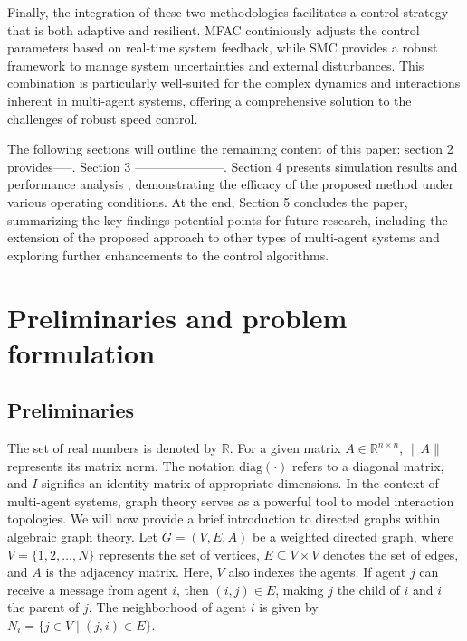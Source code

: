 \documentclass[journal,onecolumn]{IEEEtran}
\begin{document}
    Finally, the integration of these two methodologies facilitates a control strategy that is both adaptive and resilient. MFAC continiously adjusts the control parameters based on real-time system feedback, while SMC provides a robust framework to manage system uncertainties and external disturbances. This combination is particularly well-suited for the complex dynamics and interactions inherent in multi-agent systems, offering a comprehensive solution to the challenges of robust speed control.

    The following sections will outline the remaining content of this paper:
    section 2 provides-----. Section 3 ---------------------. Section 4 presents simulation results and performance analysis , demonstrating the efficacy of the proposed method under various operating conditions.
    At the end, Section 5 concludes the paper, summarizing the key findings potential points for future research, including the extension of the proposed approach to other types of multi-agent systems and exploring further enhancements to the control algorithms.



\section{Preliminaries and problem formulation}\label{section:2}
\subsection{Preliminaries}

The set of real numbers is denoted by \(\mathbb{R}\). For a given matrix \(A \in \mathbb{R}^{n \times n}\), \(\|A\|\) represents its matrix norm. The notation \(\text{diag}(\cdot)\) refers to a diagonal matrix, and \(I\) signifies an identity matrix of appropriate dimensions. In the context of multi-agent systems, graph theory serves as a powerful tool to model interaction topologies. We will now provide a brief introduction to directed graphs within algebraic graph theory. Let \(G = (V, E, A)\) be a weighted directed graph, where \(V = \{1, 2, \ldots, N\}\) represents the set of vertices, \(E \subseteq V \times V\) denotes the set of edges, and \(A\) is the adjacency matrix. Here, \(V\) also indexes the agents. If agent \(j\) can receive a message from agent \(i\), then \((i, j) \in E\), making \(j\) the child of \(i\) and \(i\) the parent of \(j\). The neighborhood of agent \(i\) is given by \(N_i = \{j \in V \mid (j, i) \in E\}\).
\end{document}
